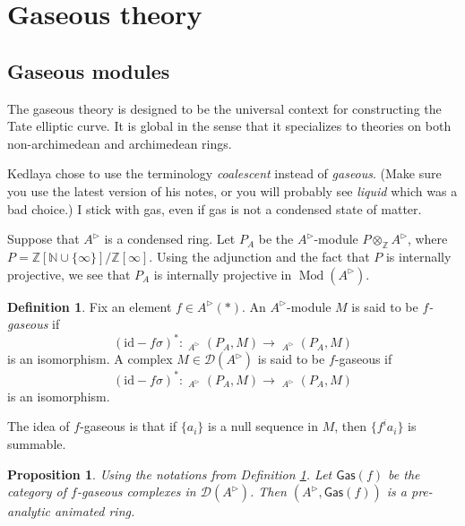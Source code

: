 \documentclass{article}
\theoremstyle{plain}
\newtheorem{prop}[thm]{Proposition}
\theoremstyle{definition}
\newtheorem{defi}[thm]{Definition}
\theoremstyle{remark}
\DeclareMathOperator{\Homs}{\underline{Hom}}
\DeclareMathOperator{\rhoms}{\underline{RHom}}
\DeclareMathOperator{\modcat}{Mod}
\newcommand{\huflag}{\triangleright}
\newcommand{\D}{\mathcal{D}}
\begin{document}
\section{Gaseous theory}

\subsection{Gaseous modules}

The gaseous theory is designed to be the universal context for constructing the Tate elliptic curve.
It is global in the sense that it specializes to theories on both non-archimedean and archimedean rings.

Kedlaya chose to use the terminology \emph{coalescent} instead of \emph{gaseous}.
(Make sure you use the latest version of his notes, or you will probably see \emph{liquid} which was a bad choice.)
I stick with gas, even if gas is not a condensed state of matter.

Suppose that $ A ^{\huflag} $ is a condensed ring.
Let $ P _{A} $ be the $ A ^{\huflag} $-module $ P \otimes _{\mathbb{Z}} A ^{\huflag} $,
where $ P = \mathbb{Z}[\mathbb{N}\cup \{\infty\}] / \mathbb{Z}[\infty] $.
Using the adjunction and the fact that $ P $ is internally projective,
we see that $ P _{A} $ is internally projective in $ \modcat (A ^{\huflag}) $.

\begin{defi}
Fix an element $ f\in A ^{\huflag} (*) $. An $ A ^{\huflag} $-module $ M $ is said to be \emph{$ f $-gaseous} if
\begin{equation*}
(\mathrm{id} - f \sigma)^{*}: \Homs _{A ^{\huflag}}(P _{A}, M) \to \Homs _{A ^{\huflag}}(P _{A}, M)
\end{equation*}
is an isomorphism.
A complex $ M\in \D (A ^{\huflag}) $ is said to be $ f $-gaseous if
\begin{equation}
(\mathrm{id}-f \sigma)^{*}: \rhoms _{A ^{\huflag}}(P _{A}, M)\to \rhoms _{A ^{\huflag}}(P _{A}, M)
\end{equation}
is an isomorphism.
\label{gaseous::def}
\end{defi}

The idea of $ f $-gaseous is that
if $ \{a _{i}\} $ is a null sequence in $ M $, then
$ \{f ^{i} a _{i}\} $ is summable.

\begin{prop}
Using the notations from Definition \ref{gaseous::def}.
Let $ \mathsf{Gas}(f) $ be the category of $ f $-gaseous complexes in $ \D (A ^{\huflag}) $.
Then $ (A ^{\huflag}, \mathsf{Gas}(f)) $ is a pre-analytic animated ring.
\end{prop}
\end{document}

